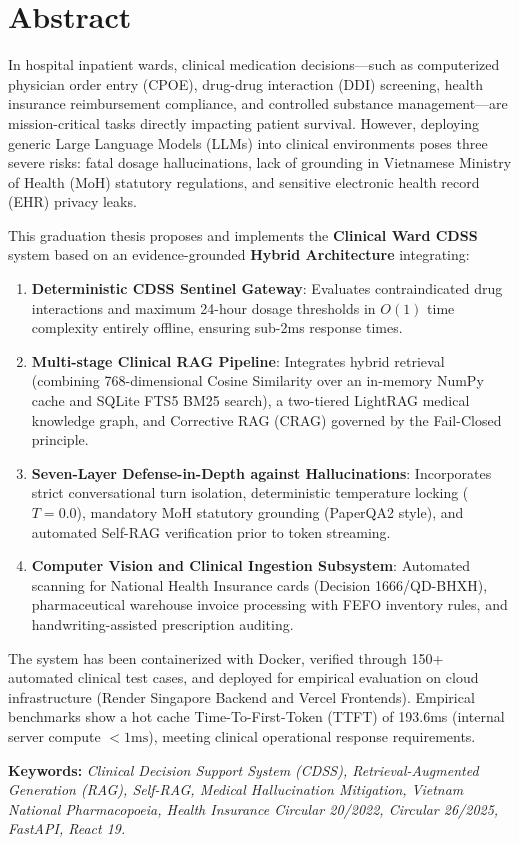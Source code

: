 \chapter*{Abstract}

In hospital inpatient wards, clinical medication decisions---such as computerized physician order entry (CPOE), drug-drug interaction (DDI) screening, health insurance reimbursement compliance, and controlled substance management---are mission-critical tasks directly impacting patient survival. However, deploying generic Large Language Models (LLMs) into clinical environments poses three severe risks: fatal dosage hallucinations, lack of grounding in Vietnamese Ministry of Health (MoH) statutory regulations, and sensitive electronic health record (EHR) privacy leaks.

This graduation thesis proposes and implements the \textbf{Clinical Ward CDSS} system based on an evidence-grounded \textbf{Hybrid Architecture} integrating:
\begin{enumerate}[leftmargin=1.5em]
    \item \textbf{Deterministic CDSS Sentinel Gateway}: Evaluates contraindicated drug interactions and maximum 24-hour dosage thresholds in $O(1)$ time complexity entirely offline, ensuring sub-2ms response times.
    \item \textbf{Multi-stage Clinical RAG Pipeline}: Integrates hybrid retrieval (combining 768-dimensional Cosine Similarity over an in-memory NumPy cache and SQLite FTS5 BM25 search), a two-tiered LightRAG medical knowledge graph, and Corrective RAG (CRAG) governed by the Fail-Closed principle.
    \item \textbf{Seven-Layer Defense-in-Depth against Hallucinations}: Incorporates strict conversational turn isolation, deterministic temperature locking ($T = 0.0$), mandatory MoH statutory grounding (PaperQA2 style), and automated Self-RAG verification prior to token streaming.
    \item \textbf{Computer Vision and Clinical Ingestion Subsystem}: Automated scanning for National Health Insurance cards (Decision 1666/QD-BHXH), pharmaceutical warehouse invoice processing with FEFO inventory rules, and handwriting-assisted prescription auditing.
\end{enumerate}

The system has been containerized with Docker, verified through 150+ automated clinical test cases, and deployed for empirical evaluation on cloud infrastructure (Render Singapore Backend and Vercel Frontends). Empirical benchmarks show a hot cache Time-To-First-Token (TTFT) of 193.6ms (internal server compute $< 1\text{ms}$), meeting clinical operational response requirements.

\textbf{Keywords:} \textit{Clinical Decision Support System (CDSS), Retrieval-Augmented Generation (RAG), Self-RAG, Medical Hallucination Mitigation, Vietnam National Pharmacopoeia, Health Insurance Circular 20/2022, Circular 26/2025, FastAPI, React 19.}
